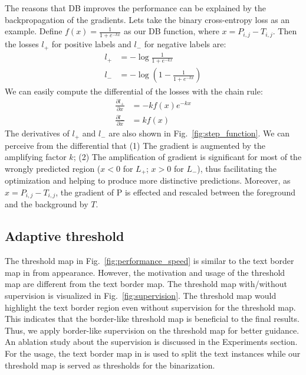 \documentclass[letterpaper]{article} %
\begin{document}
The reasons that DB improves the performance can be explained by the backpropagation of the gradients. Lets take the binary cross-entropy loss as an example. Define $f(x) = \frac {1} {1 + e^{-kx}}$ as our DB function, where $x = P_{i, j} - T_{i, j}$. Then the losses $l_{+}$ for positive labels and $l_{-}$ for negative labels are:
\begin{equation}
    \begin{split}
    l_{+} &= - \log \frac {1}{1+e^{-kx}} \\
    l_{-} &= - \log ( 1 - \frac {1}{1+e^{-kx}} )
    \end{split}
\end{equation}
We can easily compute the differential of the losses with the chain rule:
\begin{equation}
    \begin{split}
        \frac {\partial l_{+}}{\partial x} &= -kf(x)e^{-kx}\\
        \frac {\partial l_{-}}{\partial x} &= kf(x)
    \end{split}
\end{equation}
The derivatives of $l_{+}$ and $l_{-}$ are also shown in Fig.~\ref{fig:step_function}.
We can perceive from the differential that (1) The gradient is augmented by the amplifying factor $k$; (2) The amplification of gradient is significant for most of the wrongly predicted region ($x<0$ for $L_{+}$; $x>0$ for $L_{-}$), thus facilitating the optimization and helping to produce more distinctive predictions. Moreover, as $x = P_{i, j} - T_{i, j}$, the gradient of P is effected and rescaled between the foreground and the background by $T$.


\subsection{Adaptive threshold}
The threshold map in Fig.~\ref{fig:performance_speed} is similar to the text border map in \cite{xue2018accurate} from appearance. However, the motivation and usage of the threshold map are different from the text border map. The threshold map with/without supervision is visualized in Fig.~\ref{fig:supervision}.
The threshold map would highlight the text border region even without supervision for the threshold map. This indicates that the border-like threshold map is beneficial to the final results. Thus, we apply border-like supervision on the threshold map for better guidance. An ablation study about the supervision is discussed in the Experiments section.
For the usage, the text border map in \cite{xue2018accurate} is used to split the text instances while our threshold map is served as thresholds for the binarization.
\end{document}
